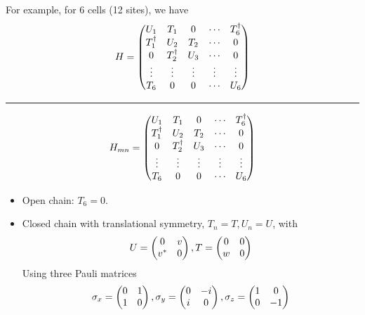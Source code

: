 \documentclass[letterpaper,10pt,english]{sphinxmanual}
\begin{document}
For example, for 6 cells (12 sites), we have
\begin{gather}
\begin{split}H=\begin{pmatrix}U_1&T_1&0&\cdots&T_6^\dagger\\
T_1^\dagger&U_2&T_2&\cdots&0\\
0&T_2^\dagger&U_3&\cdots&0\\
\vdots&\vdots&\vdots&\vdots&\vdots\\
T_6&0&0&\cdots&U_6
\end{pmatrix}\end{split}\notag
\end{gather}

\bigskip\hrule{}\bigskip

\begin{gather}
\begin{split}H_{mn}=\begin{pmatrix}U_1&T_1&0&\cdots&T_6^\dagger\\
T_1^\dagger&U_2&T_2&\cdots&0\\
0&T_2^\dagger&U_3&\cdots&0\\
\vdots&\vdots&\vdots&\vdots&\vdots\\
T_6&0&0&\cdots&U_6
\end{pmatrix}\end{split}\notag
\end{gather}\begin{itemize}
\item {}
Open chain: \(T_6=0\).

\item {}
Closed chain with translational symmetry, \(T_n=T,U_n=U\), with
\begin{gather}
\begin{split}U=\begin{pmatrix}0&v\\v^*&0\end{pmatrix},T=\begin{pmatrix}0&0\\w&0\end{pmatrix}\end{split}\notag
\end{gather}
Using three Pauli matrices
\begin{gather}
\begin{split}\sigma_x=\begin{pmatrix}0&1\\1&0\end{pmatrix},\sigma_y=\begin{pmatrix}0&-i\\i&0\end{pmatrix},\sigma_z=\begin{pmatrix}1&0\\0&-1\end{pmatrix}\end{split}\notag
\end{gather}
\end{itemize}
\end{document}
